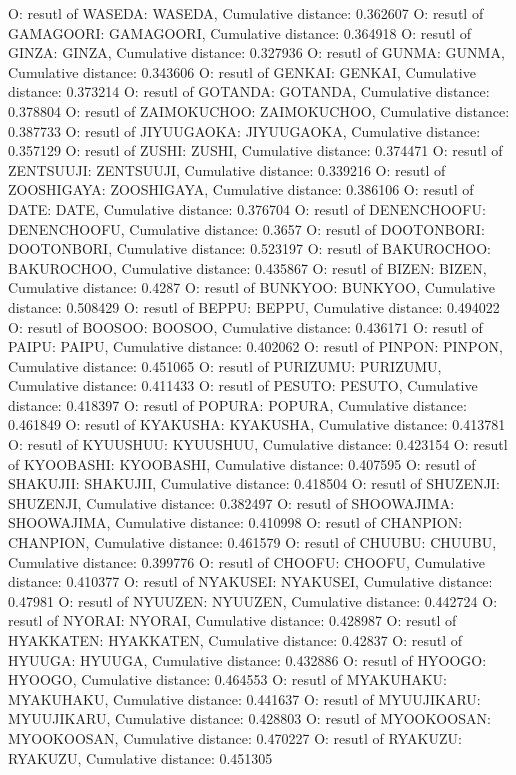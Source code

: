 O: resutl of WASEDA: WASEDA, Cumulative distance: 0.362607
O: resutl of GAMAGOORI: GAMAGOORI, Cumulative distance: 0.364918
O: resutl of GINZA: GINZA, Cumulative distance: 0.327936
O: resutl of GUNMA: GUNMA, Cumulative distance: 0.343606
O: resutl of GENKAI: GENKAI, Cumulative distance: 0.373214
O: resutl of GOTANDA: GOTANDA, Cumulative distance: 0.378804
O: resutl of ZAIMOKUCHOO: ZAIMOKUCHOO, Cumulative distance: 0.387733
O: resutl of JIYUUGAOKA: JIYUUGAOKA, Cumulative distance: 0.357129
O: resutl of ZUSHI: ZUSHI, Cumulative distance: 0.374471
O: resutl of ZENTSUUJI: ZENTSUUJI, Cumulative distance: 0.339216
O: resutl of ZOOSHIGAYA: ZOOSHIGAYA, Cumulative distance: 0.386106
O: resutl of DATE: DATE, Cumulative distance: 0.376704
O: resutl of DENENCHOOFU: DENENCHOOFU, Cumulative distance: 0.3657
O: resutl of DOOTONBORI: DOOTONBORI, Cumulative distance: 0.523197
O: resutl of BAKUROCHOO: BAKUROCHOO, Cumulative distance: 0.435867
O: resutl of BIZEN: BIZEN, Cumulative distance: 0.4287
O: resutl of BUNKYOO: BUNKYOO, Cumulative distance: 0.508429
O: resutl of BEPPU: BEPPU, Cumulative distance: 0.494022
O: resutl of BOOSOO: BOOSOO, Cumulative distance: 0.436171
O: resutl of PAIPU: PAIPU, Cumulative distance: 0.402062
O: resutl of PINPON: PINPON, Cumulative distance: 0.451065
O: resutl of PURIZUMU: PURIZUMU, Cumulative distance: 0.411433
O: resutl of PESUTO: PESUTO, Cumulative distance: 0.418397
O: resutl of POPURA: POPURA, Cumulative distance: 0.461849
O: resutl of KYAKUSHA: KYAKUSHA, Cumulative distance: 0.413781
O: resutl of KYUUSHUU: KYUUSHUU, Cumulative distance: 0.423154
O: resutl of KYOOBASHI: KYOOBASHI, Cumulative distance: 0.407595
O: resutl of SHAKUJII: SHAKUJII, Cumulative distance: 0.418504
O: resutl of SHUZENJI: SHUZENJI, Cumulative distance: 0.382497
O: resutl of SHOOWAJIMA: SHOOWAJIMA, Cumulative distance: 0.410998
O: resutl of CHANPION: CHANPION, Cumulative distance: 0.461579
O: resutl of CHUUBU: CHUUBU, Cumulative distance: 0.399776
O: resutl of CHOOFU: CHOOFU, Cumulative distance: 0.410377
O: resutl of NYAKUSEI: NYAKUSEI, Cumulative distance: 0.47981
O: resutl of NYUUZEN: NYUUZEN, Cumulative distance: 0.442724
O: resutl of NYORAI: NYORAI, Cumulative distance: 0.428987
O: resutl of HYAKKATEN: HYAKKATEN, Cumulative distance: 0.42837
O: resutl of HYUUGA: HYUUGA, Cumulative distance: 0.432886
O: resutl of HYOOGO: HYOOGO, Cumulative distance: 0.464553
O: resutl of MYAKUHAKU: MYAKUHAKU, Cumulative distance: 0.441637
O: resutl of MYUUJIKARU: MYUUJIKARU, Cumulative distance: 0.428803
O: resutl of MYOOKOOSAN: MYOOKOOSAN, Cumulative distance: 0.470227
O: resutl of RYAKUZU: RYAKUZU, Cumulative distance: 0.451305
